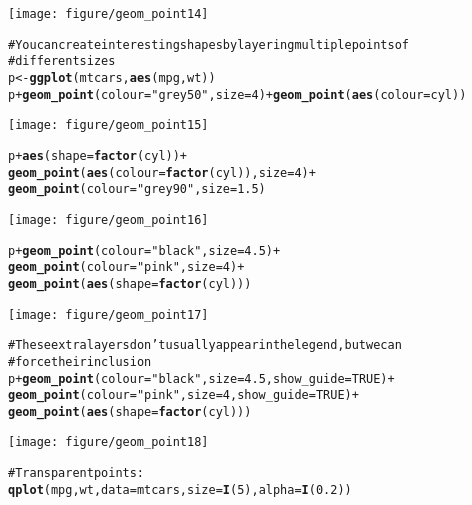 \documentclass[a4paper,titlepage]{tufte-handout}\usepackage{graphicx, color}
\makeatletter
\def\maxwidth{ %
  \ifdim\Gin@nat@width>\linewidth
    \linewidth
  \else
    \Gin@nat@width
  \fi
}
\newcommand{\hlfunctioncall}[1]{\textcolor[rgb]{0.501960784313725,0,0.329411764705882}{\textbf{#1}}}%
\newcommand{\hlstring}[1]{\textcolor[rgb]{0.6,0.6,1}{#1}}%
\newcommand{\hlcomment}[1]{\textcolor[rgb]{0.180392156862745,0.6,0.341176470588235}{#1}}%
\newenvironment{kframe}{%
 \def\at@end@of@kframe{}%
 \ifinner\ifhmode%
  \def\at@end@of@kframe{\end{minipage}}%
  \begin{minipage}{\columnwidth}%
 \fi\fi%
 \def\FrameCommand##1{\hskip\@totalleftmargin \hskip-\fboxsep
 \colorbox{shadecolor}{##1}\hskip-\fboxsep
     \hskip-\linewidth \hskip-\@totalleftmargin \hskip\columnwidth}%
 \MakeFramed {\advance\hsize-\width
   \@totalleftmargin\z@ \linewidth\hsize
   \@setminipage}}%
 {\par\unskip\endMakeFramed%
 \at@end@of@kframe}
\newenvironment{knitrout}{}{} %
\makeatother
\begin{document}
\begin{knitrout}
\begin{kframe}
\begin{alltt}
\end{alltt}
\end{kframe}\texttt{[image: figure/geom\_point14]} \begin{kframe}\begin{alltt}
\hlcomment{# You can create interesting shapes by layering multiple points of}
\hlcomment{# different sizes}
p <- \hlfunctioncall{ggplot}(mtcars, \hlfunctioncall{aes}(mpg, wt))
p + \hlfunctioncall{geom_point}(colour=\hlstring{"grey50"}, size = 4) + \hlfunctioncall{geom_point}(\hlfunctioncall{aes}(colour = cyl))
\end{alltt}
\end{kframe}\texttt{[image: figure/geom\_point15]} \begin{kframe}\begin{alltt}
p + \hlfunctioncall{aes}(shape = \hlfunctioncall{factor}(cyl)) +
  \hlfunctioncall{geom_point}(\hlfunctioncall{aes}(colour = \hlfunctioncall{factor}(cyl)), size = 4) +
  \hlfunctioncall{geom_point}(colour=\hlstring{"grey90"}, size = 1.5)
\end{alltt}
\end{kframe}\texttt{[image: figure/geom\_point16]} \begin{kframe}\begin{alltt}
p + \hlfunctioncall{geom_point}(colour=\hlstring{"black"}, size = 4.5) +
  \hlfunctioncall{geom_point}(colour=\hlstring{"pink"}, size = 4) +
  \hlfunctioncall{geom_point}(\hlfunctioncall{aes}(shape = \hlfunctioncall{factor}(cyl)))
\end{alltt}
\end{kframe}\texttt{[image: figure/geom\_point17]} \begin{kframe}\begin{alltt}
\hlcomment{# These extra layers don't usually appear in the legend, but we can}
\hlcomment{# force their inclusion}
p + \hlfunctioncall{geom_point}(colour=\hlstring{"black"}, size = 4.5, show_guide = TRUE) +
  \hlfunctioncall{geom_point}(colour=\hlstring{"pink"}, size = 4, show_guide = TRUE) +
  \hlfunctioncall{geom_point}(\hlfunctioncall{aes}(shape = \hlfunctioncall{factor}(cyl)))
\end{alltt}
\end{kframe}\texttt{[image: figure/geom\_point18]} \begin{kframe}\begin{alltt}
\hlcomment{# Transparent points:}
\hlfunctioncall{qplot}(mpg, wt, data = mtcars, size = \hlfunctioncall{I}(5), alpha = \hlfunctioncall{I}(0.2))

\end{alltt}
\end{kframe}
\end{knitrout}
\end{document}
